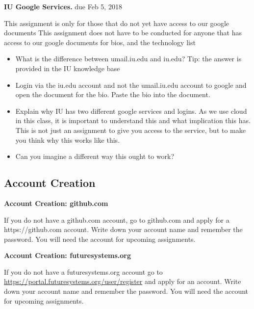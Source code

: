 \begin{exercise}\label{E:e222-iu-google}

  {\bf IU Google Services.} due Feb 5, 2018
  
  This assignment is only for those that do
  not yet have access to our google documents This assignment does not
  have to be conducted for anyone that has access to our google
  documents for bios, and the technology list

  \begin{itemize}
 
  \item What is the difference between umail.iu.edu and iu.edu? Tip:
    the answer is provided in the IU knowledge base

  \item Login via the iu.edu account and not the umail.iu.edu account
    to google and open the document for the bio. Paste the bio into
    the document.

  \item Explain why IU has two different google services and
    logins. As we use cloud in this class, it is important to
    understand this and what implication this has. This is not just an
    assignment to give you access to the service, but to make you
    think why this works like this.

  \item Can you imagine a different way this ought to work?

  \end{itemize}

\end{exercise}


\subsection{Account Creation}

\begin{exercise}

  {\bf Account Creation: github.com}
  
  If you do not have a github.com
  account, go to github.com and apply for a https://github.com
  account. Write down your account name and remember the password. You
  will need the account for upcoming assignments.

\end{exercise}

\begin{exercise}

  {\bf Account Creation: futuresystems.org}
  
  If you do not have a futuresystems.org account go to
  \url{https://portal.futuresystems.org/user/register} and apply for an
  account. Write down your account name and remember the password. You
  will need the account for upcoming assignments.

\end{exercise}

